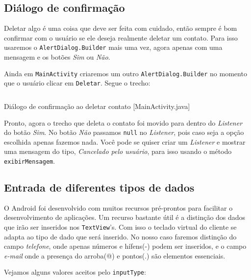 \subsection{Diálogo de confirmação}

Deletar algo é uma coisa que deve ser feita com cuidado, então sempre é bom confirmar com
o usuário se ele deseja realmente deletar um contato. Para isso usaremos o \texttt{AlertDialog.Builder}
mais uma vez, agora apenas com uma mensagem e os botões \textit{Sim} ou \textit{Não}.


Ainda em \texttt{MainActivity} criaremos um outro \texttt{AlertDialog.Builder} no momento que o usuário
clicar em \texttt{Deletar}. Segue o trecho:

\begin{listing}[H]
  \inputminted[linenos=true,frame=bottomline,tabsize=3]{ java }{ source/MainActivity-9.java }
  \caption{Diálogo de confirmação ao deletar contato [MainActivity.java]}
\end{listing}

Pronto, agora o trecho que deleta o contato foi movido para dentro do \textit{Listener} do botão
\textit{Sim}. No botão \textit{Não} passamos \texttt{null} no \textit{Listener}, pois caso
seja a opção escolhida apenas fazemos nada. Você pode se quiser criar um \textit{Listener} e mostrar
uma mensagem do tipo, \textit{Cancelado pelo usuário}, para isso usando o método \texttt{exibirMensagem}.


\subsection{Entrada de diferentes tipos de dados}

O Android foi desenvolvido com muitos recursos pré-prontos para facilitar o desenvolvimento de aplicações.
Um recurso bastante útil é a distinção dos dados que irão ser inseridos nos \texttt{TextView}'s. Com isso
o teclado virtual do cliente se adapta ao tipo de dado que será inserido. No nosso caso faremos distinção
do campo \textit{telefone}, onde apenas números e hífens(-) podem ser inseridos, e o campo \textit{e-mail}
onde a presença do arroba(@) e pontos(.) são elementos essenciais.

Vejamos alguns valores aceitos pelo \texttt{inputType}:

